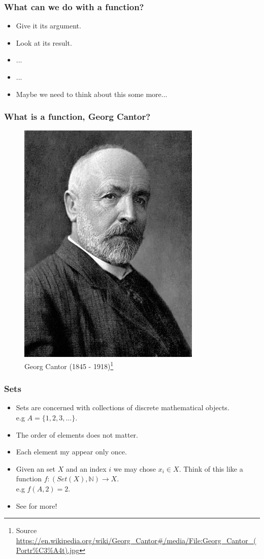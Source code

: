 \documentclass
  [hyperref={colorlinks = true,linkcolor = blue, 
             citecolor = blue, urlcolor = blue}
  ]{beamer}
\begin{document}
\begin{frame}[fragile]
\frametitle{What can we do with a function?}
  \begin{itemize}[<+->]
    \item Give it its argument.
    \item Look at its result.
    \item ...
    \item ...
    \item Maybe we need to think about this some more...
  \end{itemize}
\end{frame}


\begin{frame}[fragile]
\frametitle{Sets}
  \begin{itemize}[<+->]
    \item Sets are concerned with collections of discrete
          mathematical objects. \\
          e.g $A = \{1, 2, 3, ...\}$.
    \item The order of elements does not matter.
    \item Each element my appear only once.
    \item Given an set $X$ and an index $i$ we may 
          chose $x_i \in X$. Think of this like a function
          $f : (Set(X), \mathbb{N}) \rightarrow X$. \\
          e.g $f(A,2) = 2$.
    \item See \citep{halmos1960naive} for more!
  \end{itemize}
\end{frame}
\end{document}
